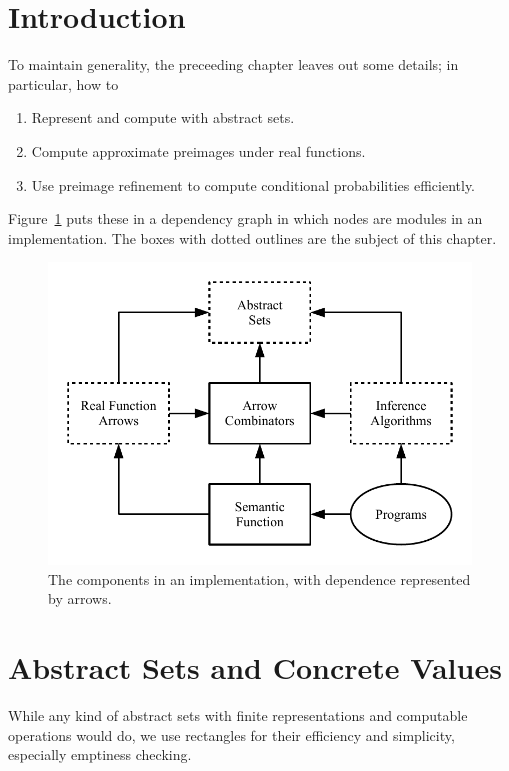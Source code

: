 
\DeclarePairedDelimiter{\ivl}{[\mspace{-4.5mu}(}{)\mspace{-4.5mu}]}

\section{Introduction}

To maintain generality, the preceeding chapter leaves out some details; in particular, how to
\begin{enumerate}
	\item Represent and compute with abstract sets.
	\item Compute approximate preimages under real functions.
	\item Use preimage refinement to compute conditional probabilities efficiently.
\end{enumerate}
Figure~\ref{fig:implementation-components} puts these in a dependency graph in which nodes are modules in an implementation.
The boxes with dotted outlines are the subject of this chapter.

\begin{figure}[b!]\centering
\includegraphics[width=4.75in]{figures/implementation-components}
\caption[Implementation dependency graph]{The components in an implementation, with dependence represented by arrows.}
\label{fig:implementation-components}
\end{figure}

\section{Abstract Sets and Concrete Values}

While any kind of abstract sets with finite representations and computable operations would do, we use rectangles for their efficiency and simplicity, especially emptiness checking.

